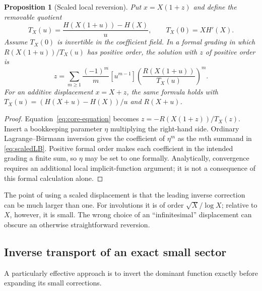 \documentclass[11pt,a4paper]{article}
\numberwithin{equation}{section}
\newtheorem{proposition}[theorem]{Proposition}
\theoremstyle{definition}
\theoremstyle{remark}
\begin{document}
\begin{proposition}[Scaled local reversion]
\label{prop:scaled}
Put $x=X(1+z)$ and define the removable quotient
\[
 T_X(u)=\frac{H(X(1+u))-H(X)}{u},\qquad T_X(0)=XH'(X).
\]
Assume $T_X(0)$ is invertible in the coefficient field. In a formal grading in which $R(X(1+u))/T_X(u)$ has positive order, the solution with $z$ of positive order is
\begin{equation}
 z=\sum_{m\ge1}\frac{(-1)^m}{m}
 [u^{m-1}]\left(\frac{R(X(1+u))}{T_X(u)}\right)^m.
 \label{eq:scaledLB}
\end{equation}
For an additive displacement $x=X+z$, the same formula holds with
$T_X(u)=(H(X+u)-H(X))/u$ and $R(X+u)$.
\end{proposition}
\begin{proof}
Equation~\eqref{eq:core-equation} becomes
$z=-R(X(1+z))/T_X(z)$. Insert a bookkeeping parameter $\eta$ multiplying the right-hand side. Ordinary Lagrange--B\"urmann inversion gives the coefficient of $\eta^m$ as the $m$th summand in \eqref{eq:scaledLB}. Positive formal order makes each coefficient in the intended grading a finite sum, so $\eta$ may be set to one formally. Analytically, convergence requires an additional local implicit-function argument; it is not a consequence of this formal calculation alone.
\end{proof}

The point of using a scaled displacement is that the leading inverse correction can be much larger than one. For involutions it is of order $\sqrt X/\log X$; relative to $X$, however, it is small. The wrong choice of an ``infinitesimal'' displacement can obscure an otherwise straightforward reversion.

\subsection{Inverse transport of an exact small sector}
\label{subsec:transport}

A particularly effective approach is to invert the dominant function exactly before expanding its small corrections.
\end{document}
